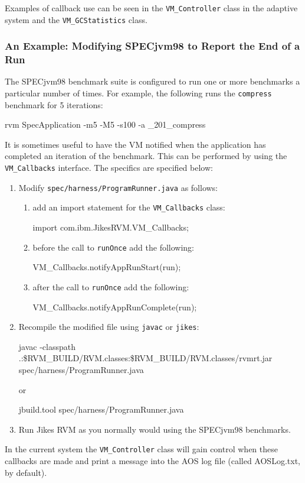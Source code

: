 Examples of callback use can be seen in the {\tt VM\_Controller} class in the
adaptive system and the {\tt VM\_GCStatistics} class.

\subsubsection{An Example: Modifying SPECjvm98 to Report the End of a
                  Run}\label{sssec:callback-example}

The SPECjvm\Rboth{}98 benchmark suite is configured to run one or more
benchmarks 
a particular number of times.  For example, the following runs the
{\tt compress} benchmark for 5 iterations:
\begin{example}
 rvm SpecApplication -m5 -M5 -s100 -a \_201\_compress
\end{example}
It is sometimes useful to have the VM notified when the application
has completed an iteration of the benchmark.   This can be performed
by using the {\tt VM\_Callbacks} interface.  The specifics are
specified below:
\begin{enumerate}
\item Modify {\tt spec/harness/ProgramRunner.java} as follows:
	\begin{enumerate}

	\item add an import statement for the {\tt VM\_Callbacks} class:
        \begin{example}
        import com.ibm.JikesRVM.VM\_Callbacks;
        \end{example}

	\item before the call to {\tt runOnce} add the following:
        \begin{example}
        VM\_Callbacks.notifyAppRunStart(run);
        \end{example}

	\item after the call to {\tt runOnce} add the following:
        \begin{example}
        VM\_Callbacks.notifyAppRunComplete(run);
        \end{example}

	\end{enumerate}

\item Recompile the modified file using {\tt javac} or {\tt jikes}:
\begin{example}
javac -classpath 
   .:\$RVM\_\-BUILD/\-RVM.clas\-ses:\$RVM\_\-BUILD/\-RVM.clas\-ses/\-rvmrt.jar
   spec/\-har\-ness/\-Pro\-gram\-Run\-ner.java
\end{example}
or
\begin{example}
jbuild.tool spec/\-har\-ness/\-Pro\-gram\-Run\-ner.java
\end{example}

\item Run Jikes RVM as you normally would using the SPECjvm98 benchmarks.
\end{enumerate}

In the current system the {\tt VM\_Controller} class will gain control
when these callbacks are made and print a message into the AOS log
file (called AOSLog.txt, by default).

